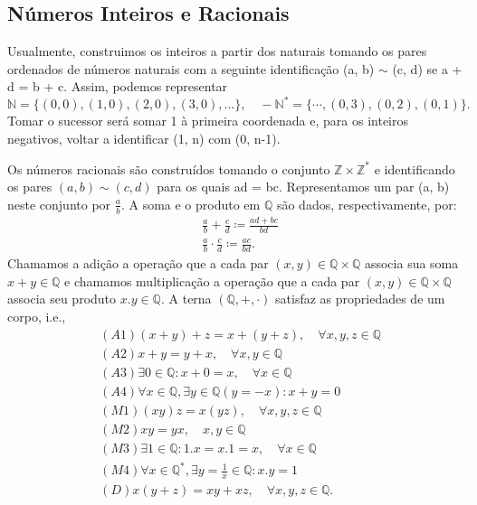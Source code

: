 \documentclass{article}
\begin{document}
 \subsection{N\'umeros Inteiros e Racionais}
  Usualmente, construimos os inteiros a partir dos naturais tomando os pares ordenados de n\'umeros naturais
com a seguinte identifica\c c\~ao (a, b) $\mathtt{\sim}$ (c, d) se a + d = b + c. Assim, podemos representar
  $$
  \mathbb{N} = \{(0, 0), (1, 0), (2, 0), (3, 0), \ldots\}, \quad -\mathbb{N}^* = \{\cdots, (0, 3), (0, 2), (0, 1)\}.
  $$
  Tomar o sucessor ser\'a somar 1 \`a primeira coordenada e, para os inteiros negativos, voltar a identificar (1, n) com (0, n-1).

  Os n\'umeros racionais s\~ao constru\'idos tomando o conjunto $\mathbb{Z}\times{\mathbb{Z}^*}$ e identificando os pares $(a, b)\mathtt{\sim}(c, d)$
para os quais ad = bc. Representamos um par (a, b) neste conjunto por $\displaystyle \frac{a}{b}.$ A soma e o produto em $\mathbb{Q}$
s\~ao dados, respectivamente, por: 
 \begin{align*}
   &\frac{a}{b} + \frac{c}{d} \coloneqq \frac{ad + bc}{bd} \\
   &\frac{a}{b}\cdot\frac{c}{d} \coloneqq \frac{ac}{bd}.
 \end{align*}
 Chamamos a adi\c c\~ao a opera\c c\~ao que a cada par $(x, y)\in \mathbb{Q}\times{\mathbb{Q}}$ associa sua soma $x+y\in \mathbb{Q}$
e chamamos multiplica\c c\~ao a opera\c c\~ao que a cada par $(x, y)\in \mathbb{Q}\times \mathbb{Q}$ associa seu produto $x.y\in \mathbb{Q}.$
A terna $(\mathbb{Q}, +, \cdot)$ satisfaz as propriedades de um corpo, i.e., 
 \begin{align*}
   &(A1) (x + y) + z = x + (y + z), \quad\forall x, y, z\in \mathbb{Q}\\
   &(A2) x + y = y + x, \quad\forall x, y\in \mathbb{Q}\\
   &(A3) \exists 0\in \mathbb{Q}: x + 0 = x, \quad\forall x\in \mathbb{Q}\\
   &(A4) \forall x\in \mathbb{Q}, \exists y\in \mathbb{Q} (y = -x): x + y = 0\\
   &(M1) (xy)z = x(yz), \quad\forall x, y, z\in \mathbb{Q}\\
   &(M2) xy = yx, \quad x, y\in \mathbb{Q}\\
   &(M3) \exists 1\in \mathbb{Q}: 1.x = x.1 = x, \quad\forall x\in \mathbb{Q}\\
   &(M4) \forall x\in \mathbb{Q}^*, \exists y = \frac{1}{x}\in \mathbb{Q}: x.y = 1\\
   &(D) x(y+z) = xy + xz,\quad\forall x, y, z\in \mathbb{Q}.
 \end{align*}
 \newpage
\end{document}
